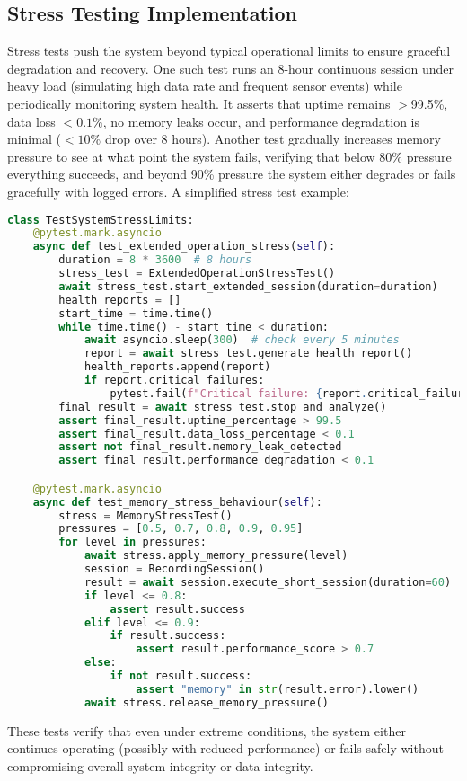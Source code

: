 \documentclass[11pt,a4paper]{report}
\begin{document}
\subsection{Stress Testing Implementation}
Stress tests push the system beyond typical operational limits to ensure graceful degradation and recovery. One such test runs an 8-hour continuous session under heavy load (simulating high data rate and frequent sensor events) while periodically monitoring system health. It asserts that uptime remains $>$99.5\%, data loss $<0.1\%$, no memory leaks occur, and performance degradation is minimal ($<10\%$ drop over 8 hours). Another test gradually increases memory pressure to see at what point the system fails, verifying that below 80\% pressure everything succeeds, and beyond 90\% pressure the system either degrades or fails gracefully with logged errors.
A simplified stress test example:
\begin{lstlisting}[language=Python]
class TestSystemStressLimits:
    @pytest.mark.asyncio
    async def test_extended_operation_stress(self):
        duration = 8 * 3600  # 8 hours
        stress_test = ExtendedOperationStressTest()
        await stress_test.start_extended_session(duration=duration)
        health_reports = []
        start_time = time.time()
        while time.time() - start_time < duration:
            await asyncio.sleep(300)  # check every 5 minutes
            report = await stress_test.generate_health_report()
            health_reports.append(report)
            if report.critical_failures:
                pytest.fail(f"Critical failure: {report.critical_failures}")
        final_result = await stress_test.stop_and_analyze()
        assert final_result.uptime_percentage > 99.5
        assert final_result.data_loss_percentage < 0.1
        assert not final_result.memory_leak_detected
        assert final_result.performance_degradation < 0.1

    @pytest.mark.asyncio
    async def test_memory_stress_behaviour(self):
        stress = MemoryStressTest()
        pressures = [0.5, 0.7, 0.8, 0.9, 0.95]
        for level in pressures:
            await stress.apply_memory_pressure(level)
            session = RecordingSession()
            result = await session.execute_short_session(duration=60)
            if level <= 0.8:
                assert result.success
            elif level <= 0.9:
                if result.success:
                    assert result.performance_score > 0.7
            else:
                if not result.success:
                    assert "memory" in str(result.error).lower()
            await stress.release_memory_pressure()
\end{lstlisting}
These tests verify that even under extreme conditions, the system either continues operating (possibly with reduced performance) or fails safely without compromising overall system integrity or data integrity.
\end{document}
